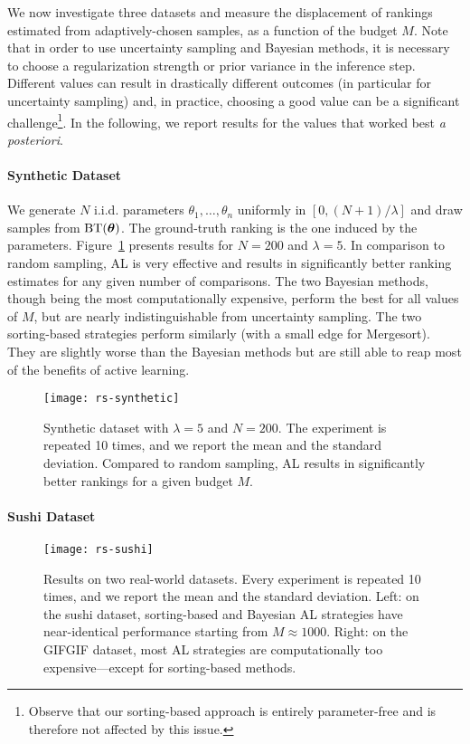 We now investigate three datasets and measure the displacement of rankings estimated from adaptively-chosen samples, as a function of the budget $M$.
Note that in order to use uncertainty sampling and Bayesian methods, it is necessary to choose a regularization strength or prior variance in the inference step.
Different values can result in drastically different outcomes (in particular for uncertainty sampling) and, in practice, choosing a good value can be a significant challenge\footnote{Observe that our sorting-based approach is entirely parameter-free and is therefore not affected by this issue.}.
In the following, we report results for the values that worked best \emph{a posteriori}.


\paragraph{Synthetic Dataset}

We generate $N$ i.i.d. parameters $\theta_1, \ldots, \theta_n$ uniformly in $[0, (N\!+\!1) / \lambda]$ and draw samples from $\operatorname{BT}(\bm{\theta})$.
The ground-truth ranking is the one induced by the parameters.
Figure~\ref{rs:fig:synthetic} presents results for $N = \num{200}$ and $\lambda = \num{5}$.
In comparison to random sampling, AL is very effective and results in significantly better ranking estimates for any given number of comparisons.
The two Bayesian methods, though being the most computationally expensive, perform the best for all values of $M$, but are nearly indistinguishable from uncertainty sampling.
The two sorting-based strategies perform similarly (with a small edge for Mergesort).
They are slightly worse than the Bayesian methods but are still able to reap most of the benefits of active learning.

\begin{figure}[t]
\centering
\texttt{[image: rs-synthetic]}
\caption{
Synthetic dataset with $\lambda = 5$ and $N = 200$.
The experiment is repeated \num{10} times, and we report the mean and the standard deviation.
Compared to random sampling, AL results in significantly better rankings for a given budget $M$.
}
\label{rs:fig:synthetic}
\end{figure}


\paragraph{Sushi Dataset}

\begin{figure}[t]
\centering
\texttt{[image: rs-sushi]}
\caption{
Results on two real-world datasets.
Every experiment is repeated \num{10} times, and we report the mean and the standard deviation.
Left: on the sushi dataset, sorting-based and Bayesian AL strategies have near-identical performance starting from $M \approx \num{1000}$.
Right: on the GIFGIF dataset, most AL strategies are computationally too expensive---except for sorting-based methods.
}
\label{rs:fig:sushi}
\end{figure}

